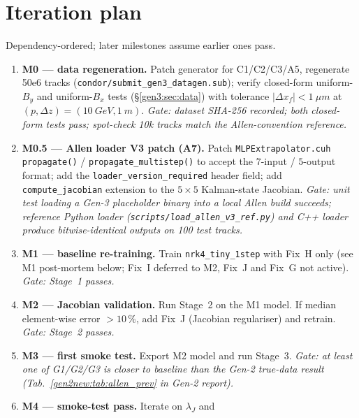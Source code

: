 \documentclass[a4paper,11pt]{article}
\newcommand{\SI}[2]{#1~#2}
\newcommand{\num}[1]{#1}
\newcommand{\dz}{\Delta z}
\begin{document}
\section{Iteration plan}\label{gen3:sec:iteration}

Dependency-ordered; later milestones assume earlier ones pass.

\begin{enumerate}
  \item \textbf{M0 --- data regeneration.} Patch generator for
        C1/C2/C3/A5, regenerate \num{50e6} tracks
        (\texttt{condor/submit\_gen3\_datagen.sub}); verify
        closed-form uniform-$B_y$ and uniform-$B_x$ tests
        (§\ref{gen3:sec:data}) with tolerance
        $|\Delta x_f|<\SI{1}{\mu m}$ at $(p,\dz)=(\SI{10}{GeV},\SI{1}{m})$.
        \emph{Gate: dataset SHA-256 recorded; both closed-form tests
        pass; spot-check 10k tracks match the Allen-convention
        reference.}
  \item \textbf{M0.5 --- Allen loader V3 patch (A7).}  Patch
        \texttt{MLPExtrapolator.cuh} \texttt{propagate()} /
        \texttt{propagate\_multistep()} to accept the
        $7$-input / $5$-output format; add the
        \texttt{loader\_version\_required} header field; add
        \texttt{compute\_jacobian} extension to the $5\times 5$
        Kalman-state Jacobian.  \emph{Gate: unit test loading a
        Gen-3 placeholder binary into a local Allen build succeeds;
        reference Python loader
        (\texttt{scripts/load\_allen\_v3\_ref.py}) and C++ loader
        produce bitwise-identical outputs on 100 test tracks.}
  \item \textbf{M1 --- baseline re-training.}  Train
        \texttt{nrk4\_tiny\_1step} with Fix~H only
        (see M1 post-mortem below; Fix~I deferred to M2, Fix~J and
        Fix~G not active).
        \emph{Gate: Stage~1 passes.}
  \item \textbf{M2 --- Jacobian validation.}  Run Stage~2 on the M1
        model.  If median element-wise error $>10\,\%$, add Fix~J
        (Jacobian regulariser) and retrain.  \emph{Gate: Stage~2
        passes.}
  \item \textbf{M3 --- first smoke test.}  Export M2 model and run
        Stage~3.  \emph{Gate: at least one of G1/G2/G3 is closer to
        baseline than the Gen-2 true-data result
        (Tab.~\ref{gen2new:tab:allen_prev} in Gen-2 report).}
  \item \textbf{M4 --- smoke-test pass.}  Iterate on $\lambda_J$ and

\end{enumerate}
\end{document}
